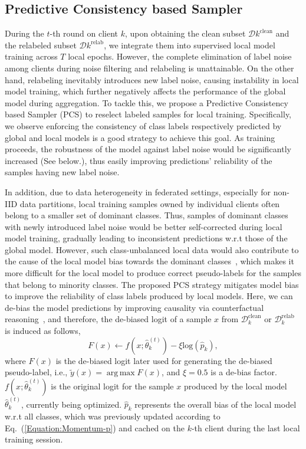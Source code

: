 \documentclass[letterpaper]{article} %
\DeclareMathOperator*{\argmax}{arg\,max}
\begin{document}
\subsection{Predictive Consistency based Sampler}

During the $t$-th round on client $k$, upon obtaining the clean subset $\mathcal{D}{k}^{\text{clean}}$ and the relabeled subset $\mathcal{D}{k}^{\text{relab}}$, we integrate them into supervised local model training across $T$ local epochs. However, the complete elimination of label noise among clients during noise filtering and relabeling is unattainable. On the other hand, relabeling inevitably introduces new label noise, causing instability in local model training, which further negatively affects the performance of the global model during aggregation. To tackle this, we propose a Predictive Consistency based Sampler (PCS) to reselect labeled samples for local training. Specifically, we observe enforcing the consistency of class labels respectively predicted by global and local models is a good strategy to achieve this goal. As training proceeds, the robustness of the model against label noise would be significantly increased (See below.), thus easily improving predictions' reliability of the samples having new label noise. 


In addition, due to data heterogeneity in federated settings, especially for non-IID data partitions, local training samples owned by individual clients often belong to a smaller set of dominant classes. Thus, samples of dominant classes with newly introduced label noise would be better self-corrected during local model training, gradually leading to inconsistent predictions w.r.t those of the global model.
However, such class-unbalanced local data would also contribute to the cause of the local model bias towards the dominant classes~\cite{imbalance}, which makes it more difficult for the local model to produce correct pseudo-labels for the samples that belong to minority classes. The proposed PCS strategy mitigates model bias to improve the reliability of class labels produced by local models. Here, we can de-bias the model predictions by improving causality via counterfactual reasoning~\cite{holland1986statistics, pearl2009causal, debiasedlearning}, and therefore, the de-biased logit of a sample $x$ from $\mathcal{D}_{k}^{\text{clean}}$ or $\mathcal{D}_{k}^{\text{relab}}$ is induced as follows,
\begin{equation}
    \label{Equation:Logit-Debias}
     F(x) \leftarrow f(x;\hat{{\theta}}_k^{(t)}) -\xi  \text{log} (\hat{p}_{k}),
\end{equation}
where $F(x)$ is the de-biased logit later used for generating the de-biased pseudo-label, i.e., $\tilde{y}(x) = \argmax F(x)$, and $\xi =0.5$ is a de-bias factor. $f(x;\hat{{\theta}}_k^{(t)})$ is the original logit for the sample $x$ produced by the local model $\hat{{\theta}}_k^{(t)}$, currently being optimized. $\hat{p}_{k}$ represents the overall bias of the local model w.r.t all classes, which was previously updated according to Eq.~(\ref{Equation:Momentum-p}) and cached on the $k$-th client during the last local training session.
\end{document}

